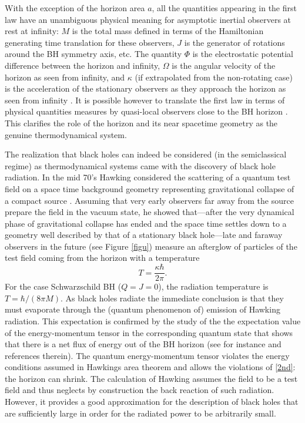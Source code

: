 \documentclass[aps, nofootinbib,superscriptaddress,12pt]{revtex4-2}
\def\be{\begin{equation}}
\def\ee{\end{equation}}
\begin{document}
With the exception of the horizon area $a$, all the quantities appearing in the first law have an unambiguous  physical meaning  for asymptotic inertial observers at rest at infinity: $M$ is the total mass defined in terms of the Hamiltonian generating time translation for these observers, $J$ is the generator of rotations around the BH symmetry axis, etc. The quantity $\Phi$ is the electrostatic potential difference between the horizon and infinity, $\Omega$ is the angular velocity of
the horizon as seen from infinity, and $\kappa$ (if
extrapolated from the non-rotating case) is the acceleration of the stationary
observers as they approach the horizon as seen from infinity \cite{wald}. It is possible however to translate the first law in terms of physical quantities measures by quasi-local observers close to the BH horizon \cite{Frodden:2011eb}.  This  clarifies the role of the horizon and its near spacetime geometry as the genuine thermodynamical system. 

The realization that black holes can indeed be considered (in the semiclassical regime) as thermodynamical systems came with the
discovery of black hole radiation. In the mid 70's Hawking considered the scattering of a quantum test field on a space time background geometry representing gravitational collapse of a compact source \cite{Hawking:1974sw}. Assuming that very early observers far away from the source prepare the field in the vacuum state, he showed that---after the very dynamical phase of gravitational collapse has ended and the space time settles down to a geometry well described by that of a stationary black hole---late and faraway observers in the future (see Figure \ref{figu}) measure an afterglow of particles of the test field coming from the horizon with a temperature
\be
T =\frac{\kappa \hbar}{2\pi}.
\ee  
For the case Schwarzschild  BH ($Q=J=0$), the radiation temperature is $T=\hbar/(8\pi M)$.
As black holes radiate the immediate conclusion is that they must evaporate through the (quantum phenomenon of) emission of Hawking radiation. This expectation is confirmed by the study of the the expectation value of the energy-momentum tensor in the corresponding quantum state that shows that there is a net flux of energy out of the BH horizon (see for instance \cite{Birrell:1982ix, Parker:2009uva} and references therein). The quantum energy-momentum tensor violates the energy conditions assumed in Hawkings area theorem and allows the violations of \eqref{2nd}: the horizon can shrink. The calculation of Hawking assumes the field to be a test field and thus neglects by construction the back reaction of such radiation.
However, it provides a good approximation for the description of black holes that are sufficiently large in order for  the radiated power to be arbitrarily small. 
\end{document}
